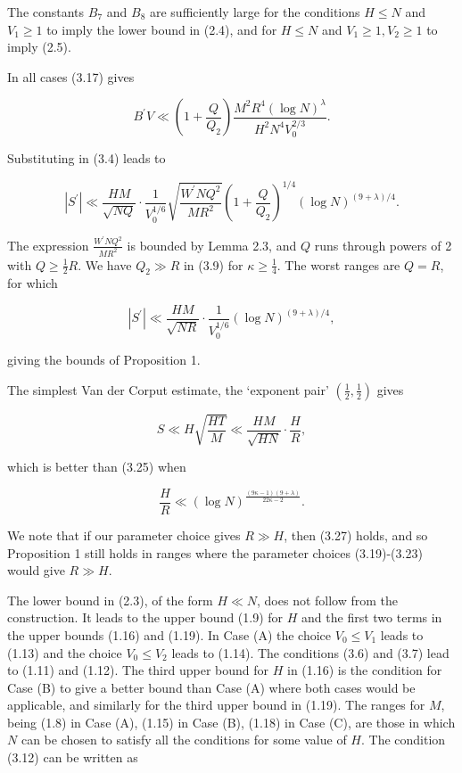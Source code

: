 \documentclass[10pt]{article}
\begin{document}
The constants $B_{7}$ and $B_{8}$ are sufficiently large for the conditions $H \leqslant N$ and $V_{1} \geqslant 1$ to imply the lower bound in (2.4), and for $H \leqslant N$ and $V_{1} \geqslant 1, V_{2} \geqslant 1$ to imply (2.5).

In all cases (3.17) gives

$$
B^{\prime} V \ll\left(1+\frac{Q}{Q_{2}}\right) \frac{M^{2} R^{4}(\log N)^{\lambda}}{H^{2} N^{4} V_{0}^{2 / 3}}.
$$

Substituting in (3.4) leads to


\begin{equation*}
\left|S^{\prime}\right| \ll \frac{H M}{\sqrt{N Q}} \cdot \frac{1}{V_{0}^{1 / 6}} \sqrt{\frac{W^{\prime} N Q^{2}}{M R^{2}}}\left(1+\frac{Q}{Q_{2}}\right)^{1 / 4}(\log N)^{(9+\lambda) / 4}. \tag{3.24}
\end{equation*}


The expression $\frac{W^{\prime}NQ^{2}}{MR^{2}}$ is bounded by Lemma 2.3, and $Q$ runs through powers of 2 with $Q \geqslant \frac{1}{2} R$. We have $Q_{2} \gg R$ in (3.9) for $\kappa \geqslant \frac{1}{4}$. The worst ranges are $Q=R$, for which


\begin{equation*}
\left|S^{\prime}\right| \ll \frac{H M}{\sqrt{N R}} \cdot \frac{1}{V_{0}^{1 / 6}}(\log N)^{(9+\lambda) / 4}, \tag{3.25}
\end{equation*}


giving the bounds of Proposition 1.

The simplest Van der Corput estimate, the `exponent pair' $\left(\frac{1}{2}, \frac{1}{2}\right)$ gives


\begin{equation*}
S \ll H \sqrt{\frac{H T}{M}} \ll \frac{H M}{\sqrt{H N}} \cdot \frac{H}{R}, \tag{3.26}
\end{equation*}


which is better than (3.25) when


\begin{equation*}
\frac{H}{R} \ll(\log N)^{\frac{(9 \kappa-1)(9+\lambda)}{22 \kappa-2}}. \tag{3.27}
\end{equation*}


We note that if our parameter choice gives $R \gg H$, then (3.27) holds, and so Proposition 1 still holds in ranges where the parameter choices (3.19)-(3.23) would give $R \gg H$.

The lower bound in (2.3), of the form $H \ll N$, does not follow from the construction. It leads to the upper bound (1.9) for $H$ and the first two terms in the upper bounds (1.16) and (1.19). In Case (A) the choice $V_{0} \leqslant V_{1}$ leads to (1.13) and the choice $V_{0} \leqslant V_{2}$ leads to (1.14). The conditions (3.6) and (3.7) lead to (1.11) and (1.12). The third upper bound for $H$ in (1.16) is the condition for Case (B) to give a better bound than Case (A) where both cases would be applicable, and similarly for the third upper bound in (1.19). The ranges for $M$, being (1.8) in Case (A), (1.15) in Case (B), (1.18) in Case (C), are those in which $N$ can be chosen to satisfy all the conditions for some value of $H$. The condition (3.12) can be written as
\end{document}
